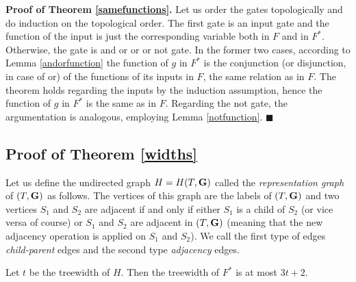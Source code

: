 \documentclass{llncs}
\begin{document}
{\bf Proof of Theorem \ref{samefunctions}.}
Let us order the gates topologically and do induction on the topological order. The first gate is an input gate and the function of the input is just the corresponding variable both in $F$ and in $F^*$. Otherwise, the gate is {\sc and} or {\sc or} or {\sc not} gate. In the former two cases, according to Lemma \ref{andorfunction} the function of $g$ in $F^*$ is the conjunction (or disjunction, in case of {\sc or}) of the functions of its inputs in $F$, the same relation as in $F$. The theorem holds regarding the inputs by the induction assumption, hence the function of $g$ in $F^*$ is the same as in $F$. Regarding the {\sc not} gate, the argumentation is analogous, employing Lemma \ref{notfunction}. $\blacksquare$




\subsection{Proof of Theorem \ref{widths}} \label{twidth}
\begin{comment}
A direct construction of tree decomposition of $F^*$ is quite a cumbersome task.
Indeed, the topology of $F^*$ essentially involves three 'similar' structures induced by $oand$
$oor$ and $in$ gates and it would not look very elegant to repeat the same of reasoning for each
of these parts. We follow, in our opinion, a more elegant approach. We introduce a graph retaining
the essential structure of $F^*$, quite easily show that the treewidth of $F^*$ is at most $3$
times as the treewidth of this graph and then show tat the treewidth of this graph is at most
twice as the width of $(T,{\bf G})$. The result immediately follows from the combination of these
two statements.
\end{comment}

Let us define the undirected graph $H=H(T,{\bf G})$ called the
\emph{representation graph} of $(T,{\bf G})$ as follows. The vertices of this graph are the labels of $(T,{\bf G})$ 
and two vertices $S_1$ and $S_2$ are adjacent if and only if either $S_1$ is a child of $S_2$ (or vice versa of course) or $S_1$ and $S_2$ are adjacent in 
$(T,{\bf G})$ (meaning that the new adjacency operation is applied on $S_1$ and $S_2$).
We call the first type of edges \emph{child-parent} edges
and the second type \emph{adjacency} edges.


 
\begin{lemma} \label{widthf}
Let $t$ be the treewidth of $H$.
Then the treewidth of $F^*$ is at most $3t+2$.
\end{lemma}
\end{document}
